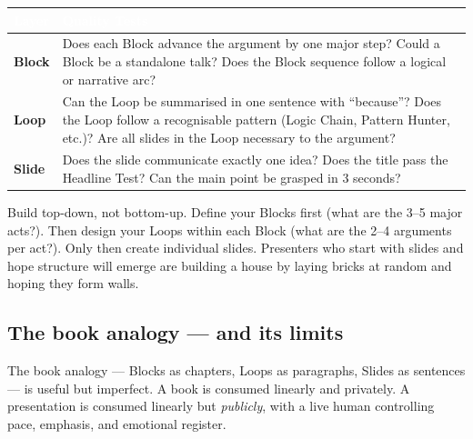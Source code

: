 \begin{center}
\small
{}
\begin{tabularx}{\textwidth}{>{\bfseries\color{heading}}l X}
\toprule
\rowcolor{tableheader}
\textcolor{white}{\textbf{Layer}} & \textcolor{white}{\textbf{Quality Tests}} \\
\midrule
Block & Does each Block advance the argument by one major step? Could a Block be a standalone talk? Does the Block sequence follow a logical or narrative arc? \\
Loop & Can the Loop be summarised in one sentence with ``because''? Does the Loop follow a recognisable pattern (Logic Chain, Pattern Hunter, etc.)? Are all slides in the Loop necessary to the argument? \\
\rowcolor{altrow}
Slide & Does the slide communicate exactly one idea? Does the title pass the Headline Test? Can the main point be grasped in 3 seconds? \\
\bottomrule
\end{tabularx}
\end{center}

\vspace{0.5em}

\begin{keybox}
Build top-down, not bottom-up. Define your Blocks first (what are the 3--5 major acts?). Then design your Loops within each Block (what are the 2--4 arguments per act?). Only then create individual slides. Presenters who start with slides and hope structure will emerge are building a house by laying bricks at random and hoping they form walls.
\end{keybox}

\subsection{The book analogy --- and its limits}

The book analogy --- Blocks as chapters, Loops as paragraphs, Slides as sentences --- is useful but imperfect. A book is consumed linearly and privately. A presentation is consumed linearly but \emph{publicly}, with a live human controlling pace, emphasis, and emotional register.

